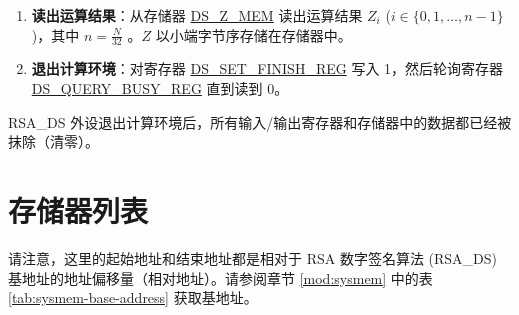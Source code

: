 \documentclass[main\_\_CN.tex]{subfiles}
\begin{document}
\begin{enumerate}
\begin{itemize}
        \item 如果返回值为 1，则说明填充校验通过，但 MD 校验失败。\begin{math}Z\end{math} 结果值全零无效，跳至步骤 \ref{Exit}。

        \item 如果返回值为 2，则说明填充校验通过失败，但 MD 校验通过，用户可以继续读取 \begin{math}Z\end{math} 结果值。但仍需注意的是，数据填充不符合 PKCS\#7 封装方式，这可能不是你想要的。

        \item 如果返回值为 3，则说明填充填充校验失败，且 MD 校验失败。 这种情况说明有致命错误发生。\begin{math}Z\end{math} 结果值全零无效。跳至步骤 \ref{Exit}。

    \end{itemize}

    \item {\bfseries 读出运算结果}：从存储器 \hyperref[DSZMEM]{DS\_Z\_MEM} 读出运算结果 \begin{math}Z_{i}\end{math} (\begin{math}i \in \{0,1, \dots,n-1\}\end{math})，其中 \begin{math} n = \frac{N}{32} \end{math} 。\begin{math}Z\end{math} 以小端字节序存储在存储器中。

    \item {\bfseries 退出计算环境\label{Exit}}：对寄存器 \hyperref[regdesc:DSSETFINISHREG]{DS\_SET\_FINISH\_REG} 写入 1，然后轮询寄存器 \hyperref[regdesc:DSQUERYBUSYREG]{DS\_QUERY\_BUSY\_REG} 直到读到 0。

\end{enumerate}

RSA\_DS 外设退出计算环境后，所有输入/输出寄存器和存储器中的数据都已经被抹除（清零）。

\clearpage
\section{ 存储器列表 }

请注意，这里的起始地址和结束地址都是相对于 RSA 数字签名算法 (RSA\_DS) 基地址的地址偏移量（相对地址）。请参阅章节 \ref{mod:sysmem} \textit{} 中的表 \ref{tab:sysmem-base-address} 获取基地址。
\end{document}
